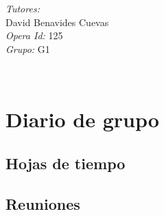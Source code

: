 \documentclass[12pt]{article}
\begin{document}
\begin{titlepage}
\begin{minipage}{0.4\textwidth}
			\begin{flushright} \large
			\emph{Tutores:} \\
			David Benavides Cuevas\\
            \emph{Opera Id: }
            125\\
			\emph{Grupo: }            
            G1\\
            
            
		\end{flushright}
        
	\end{minipage}\\[2 cm]
	
	
    
    
    
    
	
\end{titlepage}


\tableofcontents
\listoftables
\pagebreak


\section{Diario de grupo}

\subsection{Hojas de tiempo}


\subsection{Reuniones}
\end{document}
